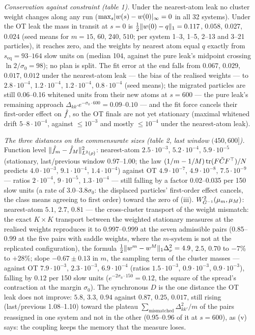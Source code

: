\smallskip
\noindent\emph{Conservation against constraint (table 1).} Under the nearest-atom leak no cluster weight changes
along any run ($\max_s\lvert w(s) - w(0)\rvert_\infty = 0$ in all 32 systems). Under the OT leak the mass in transit at
$s = 0$ is $\frac12\lVert w(0) - q\rVert_1 = 0.117$, $0.058$, $0.027$, $0.024$ (seed means for $m = 15$, $60$, $240$,
$510$; per system 1--3, 1--5, 2--13 and 3--21 particles), it reaches zero, and the weights by nearest atom equal $q$
exactly from $s_{\mathrm{eq}} = 93$--$164$ slow units on (median 104, against the pure leak's midpoint crossing
$\ln2/\sigma_0 = 98$); no plan is split. The fit error at the end falls from $0.067$, $0.029$, $0.017$, $0.012$ under
the nearest-atom leak --- the bias of the realised weights --- to $2.8\cdot10^{-4}$, $1.2\cdot10^{-4}$,
$1.2\cdot10^{-4}$, $0.8\cdot10^{-4}$ (seed means); the migrated particles are still 0.06--0.16 whitened units from
their new atoms at $s = 600$ --- the pure leak's remaining approach
$\Delta_{kk'}e^{-\sigma_0\cdot600} = 0.09$--$0.10$ --- and the fit force cancels their first-order effect on
$\hat f$, so the OT finals are not yet stationary (maximal whitened drift $5$--$8\cdot10^{-4}$, against
$\le10^{-3}$ and mostly $\le10^{-4}$ under the nearest-atom leak).

\smallskip
\noindent\emph{The three distances on the commensurate sizes (table 2, last window $(450,600]$).} Function level
$\lVert \hat f_m - \hat f_M\rVert^2_{L^2(\rho)}$: nearest-atom $2.5\cdot10^{-3}$, $5.2\cdot10^{-4}$, $5.9\cdot10^{-5}$
(stationary, last/previous window 0.97--1.00; the law $(1/m - 1/M)\operatorname{tr}(F\tilde CF^\top)/N$ predicts $4.0\cdot10^{-3}$,
$9.1\cdot10^{-4}$, $1.4\cdot10^{-4}$) against OT $4.9\cdot10^{-7}$, $4.9\cdot10^{-8}$, $7.5\cdot10^{-9}$ --- ratios
$2\cdot10^{-4}$, $9\cdot10^{-5}$, $1.3\cdot10^{-4}$ --- still falling by a factor 0.02--0.035 per 150 slow units (a
rate of $3.0$--$3.8\sigma_0$: the displaced particles' first-order effect cancels, the class means agreeing to first
order) toward the zero of (iii). $W^2_{G^{-1}}(\mu_m,\mu_M)$: nearest-atom $5.1$, $2.7$, $0.81$ --- the cross-cluster
transport of the weight mismatch: the exact $K\times K$ transport between the weighted stationary measures at the
realised weights reproduces it to 0.997--0.999 at the seven admissible pairs (0.85--0.99 at the five pairs with
saddle weights, where the $m$-system is not at the replicated configuration), the formula
$\frac12\lVert w^m - w^M\rVert_1\Delta_\nu^2 = 4.9$, $2.5$, $0.70$ to $-7$\% to $+28$\%; slope $-0.67\pm0.13$ in $m$, the
sampling term of the cluster masses --- against OT $7.9\cdot10^{-3}$, $2.3\cdot10^{-3}$, $6.9\cdot10^{-4}$ (ratios
$1.5\cdot10^{-3}$, $0.9\cdot10^{-3}$, $0.9\cdot10^{-3}$), falling by $0.12$ per 150 slow units
($e^{-2\sigma_0\cdot150} = 0.12$, the square of the spread's contraction at the margin $\sigma_0$). The synchronous
$D$ is the one distance the OT leak does not improve: $5.8$, $3.3$, $0.94$ against $0.87$, $0.25$, $0.017$, still
rising (last/previous 1.08--1.10) toward the plateau $\sum_{\mathrm{mismatched}}\Delta^2_{kk'}/m$ of the pairs
reassigned in one system and not in the other (0.95--0.96 of it at $s = 600$), as (v) says: the coupling keeps the
memory that the measure loses.

